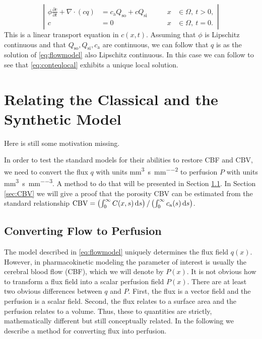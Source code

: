 \documentclass[paper=a4, fontsize=11pt,parskip=half,headings=small]{scrartcl}
\newcommand{\Qso}{Q_{\mathrm{so}}}
\newcommand{\Qsi}{Q_{\mathrm{si}}}
\newcommand{\ca}{c_\mathrm{a}}
\newcommand{\CBV}{\mathrm{CBV}}
\newcommand{\siq}{\cubic\milli\meter\per\second\per\square\milli\meter}
\newcommand{\siP}{\cubic\milli\meter\per\second\per\cubic\milli\meter}
\begin{document}
	\begin{equation}
		\left\vert
		\begin{alignedat}{2}
			\phi \frac{\partial c}{\partial t} + \nabla \cdot (cq) &= \ca\Qso + c\Qsi \qquad	&x &\in \Omega, \ t>0,  \\
			c &= 0 																			 	&x &\in \Omega, \ t=0.
		\end{alignedat}
		\right\vert
		\label{eq:conteqlocal}
	\end{equation}
	This is a linear transport equation in $c(x,t)$. 
	Assuming that $\phi$ is Lipschitz continuous and that $\Qso,\Qsi,\ca$ are continuous, we can follow that $q$ is as the solution of \eqref{eq:flowmodel} also Lipschitz continuous.
	In this case we can follow \cite{evans98} to see that \eqref{eq:conteqlocal} exhibits a unique local solution.
	


	\section{Relating the Classical and the Synthetic Model}\label{sec:relation}
	Here is still some motivation missing.
	
	In order to test the standard models for their abilities to restore CBF and CBV, we need to convert the flux $q$ with units \si{\siq} to perfusion $P$ with units \si{\siP}. 
	A method to do that will be presented in Section \ref{sec:flux2perf}.
	In Section \ref{sec:CBV} we will give a proof that the porosity CBV can be estimated from the standard relationship $\CBV = \left(\int_0^\infty C(x,s) \diffint s\right)/\left(\int_0^\infty \ca(s) \diffint s\right)$.
	
	
	
	\subsection{Converting Flow to Perfusion}\label{sec:flux2perf}
	The model described in \eqref{eq:flowmodel} uniquely determines the flux field $q(x)$. 
	However, in pharmacokinetic modeling the parameter of interest is usually the cerebral blood flow (CBF), which we will denote by $P(x)$.
	It is not obvious how to transform a flux field into a scalar perfusion field $P(x)$.
	There are at least two obvious differences between $q$ and $P$. 
	First, the flux is a vector field and the perfusion is a scalar field. 
	Second, the flux relates to a surface area and the perfusion relates to a volume. 
	Thus, these to quantities are strictly, mathematically different but still conceptually related. 
	In the following we describe a method for converting flux into perfusion.
\end{document}
